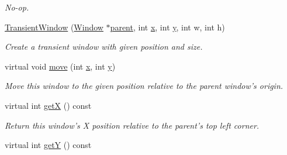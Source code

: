 \begin{DoxyCompactItemize}
\begin{DoxyCompactList}\small\item\em No-\/op. \end{DoxyCompactList}\item 
\hyperlink{classGUI_1_1TransientWindow_a9d3c071b550810d79451acb5959026fd}{Transient\-Window} (\hyperlink{classGUI_1_1Window}{Window} $\ast$\hyperlink{classGUI_1_1Window_a2e593ff65e7702178d82fe9010a0b539}{parent}, int \hyperlink{classGUI_1_1Window_a6ca6a80ca00c9e1d8ceea8d3d99a657d}{x}, int \hyperlink{classGUI_1_1Window_a0ee8e923aff2c3661fc2e17656d37adf}{y}, int w, int h)
\begin{DoxyCompactList}\small\item\em Create a transient window with given position and size. \end{DoxyCompactList}\item 
virtual void \hyperlink{classGUI_1_1TransientWindow_aec97d27a3f4ece3138c58d9fb40fbccc}{move} (int \hyperlink{classGUI_1_1Window_a6ca6a80ca00c9e1d8ceea8d3d99a657d}{x}, int \hyperlink{classGUI_1_1Window_a0ee8e923aff2c3661fc2e17656d37adf}{y})
\begin{DoxyCompactList}\small\item\em Move this window to the given position relative to the parent window's origin. \end{DoxyCompactList}\item 
\hypertarget{classGUI_1_1TransientWindow_a86352691dc46f2aa44234be025efc944}{virtual int \hyperlink{classGUI_1_1TransientWindow_a86352691dc46f2aa44234be025efc944}{get\-X} () const }\label{classGUI_1_1TransientWindow_a86352691dc46f2aa44234be025efc944}

\begin{DoxyCompactList}\small\item\em Return this window's X position relative to the parent's top left corner. \end{DoxyCompactList}\item 
\hypertarget{classGUI_1_1TransientWindow_af9b5c0937927c046fc4ea7d59b9ddf7a}{virtual int \hyperlink{classGUI_1_1TransientWindow_af9b5c0937927c046fc4ea7d59b9ddf7a}{get\-Y} () const }\label{classGUI_1_1TransientWindow_af9b5c0937927c046fc4ea7d59b9ddf7a}


\end{DoxyCompactItemize}
